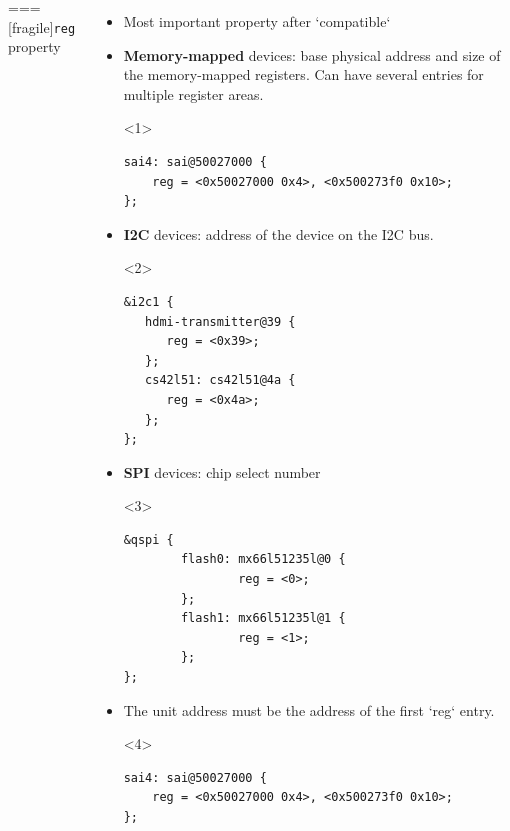 \begin{columns}[t]
\begin{columns}[t]
\begin{columns}[t]
\begin{columns}[t]
=== [fragile]{{\tt reg} property}
  \begin{itemize}
  \item Most important property after `compatible`
  \item {\bf Memory-mapped} devices: base physical address and size of
    the memory-mapped registers. Can have several entries for multiple
    register areas.
\begin{onlyenv}<1>
\begin{block}{}
\begin{verbatim}
sai4: sai@50027000 {
    reg = <0x50027000 0x4>, <0x500273f0 0x10>;
};
\end{verbatim}
\end{block}
\end{onlyenv}
\pause
  \item {\bf I2C} devices: address of the device on the I2C bus.
\begin{onlyenv}<2>
\begin{block}{}
\begin{verbatim}
&i2c1 {
   hdmi-transmitter@39 {
      reg = <0x39>;
   };
   cs42l51: cs42l51@4a {
      reg = <0x4a>;
   };
};
\end{verbatim}
\end{block}
\end{onlyenv}
\pause
  \item {\bf SPI} devices: chip select number
\begin{onlyenv}<3>
\begin{block}{}
\begin{verbatim}
&qspi {
        flash0: mx66l51235l@0 {
                reg = <0>;
        };
        flash1: mx66l51235l@1 {
                reg = <1>;
        };
};
\end{verbatim}
\end{block}
\end{onlyenv}
\pause
\item The unit address must be the address of the first `reg`
  entry.
\begin{onlyenv}<4>
\begin{block}{}
\begin{verbatim}
sai4: sai@50027000 {
    reg = <0x50027000 0x4>, <0x500273f0 0x10>;
};
\end{verbatim}
\end{block}
\end{onlyenv}
  \end{itemize}



\end{columns}
\end{columns}
\end{columns}
\end{columns}
